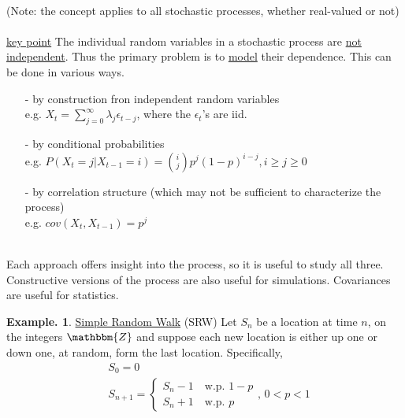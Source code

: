 \documentclass[12pt]{article}
\theoremstyle{definition}
\newtheorem{myexp}{Example.}[section]
\theoremstyle{plain}
\begin{document}
$\mbox{}$\\
(Note: the concept applies to all stochastic processes, whether real-valued or not)\\ \\
\underline{key point} The individual random variables in a stochastic process are \underline{not independent}. Thus the primary problem is to \underline{model} their dependence. This can be done in various ways.
\begin{itemize}
\item[-]  by construction fron independent random variables\\
e.g. $X_t = \sum_{j=0}^\infty \lambda_j \epsilon_{t-j}$, where the $\epsilon_t$'s are iid.
\item[-] by conditional probabilities\\
e.g. $P(X_t = j | X_{t-1} = i) = {i \choose j}p^j (1-p)^{i-j}, i \geq j \geq 0$ 
\item[-] by correlation structure (which may not be sufficient to characterize the process) \\
e.g. $cov(X_t, X_{t-1})=p^j$
\end{itemize}
$\mbox{}$\\
Each approach offers insight into the process, so it is useful to study all three. Constructive versions of the process are also useful for simulations. Covariances are useful for statistics.
\begin{myexp}
\underline{Simple Random Walk} (SRW)
Let $S_n$ be a location at time $n$, on the integers $\mathbbm{Z}$ and suppose each new location is either up one or down one, at random, form the last location. Specifically,\begin{displaymath}\begin{aligned}&S_0 = 0 \\ &S_{n+1} = \begin{cases}S_n - 1 \quad \mbox{w.p. $1-p$}\\S_n + 1 \quad \mbox{w.p. $p$}\end{cases} \mbox{, $0 < p <1$}\end{aligned} \end{displaymath}
\end{myexp}
\end{document}
